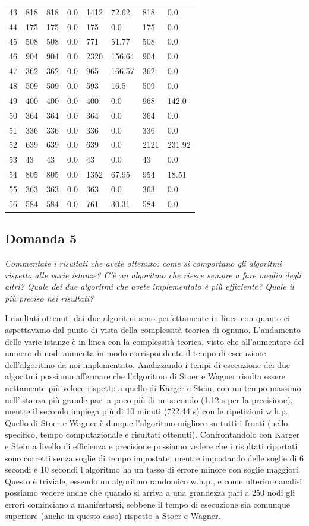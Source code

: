 \begin{longtable}{llllllll}
	43 & 818 & 818 & 0.0 & 1412 & 72.62 & 818 & 0.0 \\
	44 & 175 & 175 & 0.0 & 175 & 0.0 & 175 & 0.0 \\
	45 & 508 & 508 & 0.0 & 771 & 51.77 & 508 & 0.0 \\
	46 & 904 & 904 & 0.0 & 2320 & 156.64 & 904 & 0.0 \\
	47 & 362 & 362 & 0.0 & 965 & 166.57 & 362 & 0.0 \\
	48 & 509 & 509 & 0.0 & 593 & 16.5 & 509 & 0.0 \\
	49 & 400 & 400 & 0.0 & 400 & 0.0 & 968 & 142.0 \\
	50 & 364 & 364 & 0.0 & 364 & 0.0 & 364 & 0.0 \\
	51 & 336 & 336 & 0.0 & 336 & 0.0 & 336 & 0.0 \\
	52 & 639 & 639 & 0.0 & 639 & 0.0 & 2121 & 231.92 \\
	53 & 43 & 43 & 0.0 & 43 & 0.0 & 43 & 0.0 \\
	54 & 805 & 805 & 0.0 & 1352 & 67.95 & 954 & 18.51 \\
	55 & 363 & 363 & 0.0 & 363 & 0.0 & 363 & 0.0 \\
	56 & 584 & 584 & 0.0 & 761 & 30.31 & 584 & 0.0
	\end{longtable}

\subsection{Domanda 5}
\textit{Commentate i risultati che avete ottenuto: come si comportano gli algoritmi rispetto alle varie istanze? C'è un algoritmo che riesce sempre a fare meglio degli altri? Quale dei due algoritmi che avete implementato è più efficiente? Quale il più preciso nei risultati?}

I risultati ottenuti dai due algoritmi sono perfettamente in linea con quanto ci aspettavamo dal punto di vista della complessità teorica di ognuno. L'andamento delle varie istanze è in linea con la complessità teorica, visto che all'aumentare del numero di nodi aumenta in modo corrispondente il tempo di esecuzione dell'algoritmo da noi implementato. 
Analizzando i tempi di esecuzione dei due algoritmi possiamo affermare che l'algoritmo di Stoer e Wagner risulta essere nettamente più veloce rispetto a quello di Karger e Stein, con un tempo massimo nell'istanza più grande pari a poco più di un secondo (1.12 s per la precisione), mentre il secondo impiega più di 10 minuti (722.44 s) con le ripetizioni w.h.p. Quello di Stoer e Wagner è dunque l'algoritmo migliore su tutti i fronti (nello specifico, tempo computazionale e risultati ottenuti). Confrontandolo con Karger e Stein a livello di efficienza e precisione possiamo vedere che i risultati riportati sono corretti senza soglie di tempo impostate, mentre impostando delle soglie di 6 secondi e 10 secondi l'algoritmo ha un tasso di errore minore con soglie maggiori. Questo è triviale, essendo un algoritmo randomico w.h.p., e come ulteriore analisi possiamo vedere anche che quando si arriva a una grandezza pari a 250 nodi gli errori cominciano a manifestarsi, sebbene il tempo di esecuzione sia comunque superiore (anche in questo caso) rispetto a Stoer e Wagner. 
